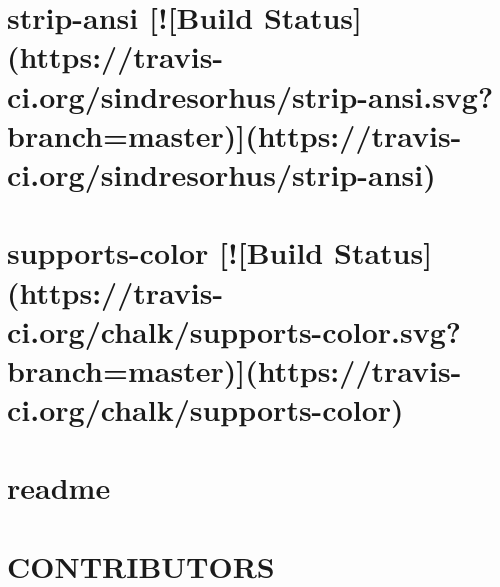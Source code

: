 \documentclass[twoside]{book}
\newcommand{\+}{\discretionary{\mbox{\scriptsize$\hookleftarrow$}}{}{}}
\begin{document}
\chapter{strip-\/ansi \mbox{[}!\mbox{[}Build Status\mbox{]}(https\+://travis-\/ci.org/sindresorhus/strip-\/ansi.svg?branch=master)\mbox{]}(https\+://travis-\/ci.org/sindresorhus/strip-\/ansi)}
\label{md__c_1__users_martin__documents__git_hub_visual_studio__bachelor__wis_r__wis_r_node_modules_gru8c4202bd19d1919e5125bda09ae43080}
\hypertarget{md__c_1__users_martin__documents__git_hub_visual_studio__bachelor__wis_r__wis_r_node_modules_gru8c4202bd19d1919e5125bda09ae43080}{}

\chapter{supports-\/color \mbox{[}!\mbox{[}Build Status\mbox{]}(https\+://travis-\/ci.org/chalk/supports-\/color.svg?branch=master)\mbox{]}(https\+://travis-\/ci.org/chalk/supports-\/color)}
\label{md__c_1__users_martin__documents__git_hub_visual_studio__bachelor__wis_r__wis_r_node_modules_grufa2d9ab603b2adc0f3354fe7621ae57e}
\hypertarget{md__c_1__users_martin__documents__git_hub_visual_studio__bachelor__wis_r__wis_r_node_modules_grufa2d9ab603b2adc0f3354fe7621ae57e}{}

\chapter{readme}
\label{md__c_1__users_martin__documents__git_hub_visual_studio__bachelor__wis_r__wis_r_node_modules_gru04d78c65eed710ba883f0abe096657de}
\hypertarget{md__c_1__users_martin__documents__git_hub_visual_studio__bachelor__wis_r__wis_r_node_modules_gru04d78c65eed710ba883f0abe096657de}{}

\chapter{C\+O\+N\+T\+R\+I\+B\+U\+T\+O\+R\+S}
\label{md__c_1__users_martin__documents__git_hub_visual_studio__bachelor__wis_r__wis_r_node_modules_grue8695e684cfced984864f919e77508db}
\hypertarget{md__c_1__users_martin__documents__git_hub_visual_studio__bachelor__wis_r__wis_r_node_modules_grue8695e684cfced984864f919e77508db}{}

\end{document}
